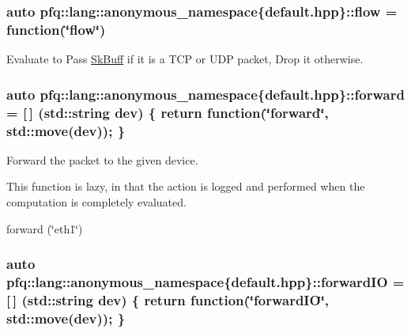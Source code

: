 \subsubsection[{\texorpdfstring{flow}{flow}}]{\setlength{\rightskip}{0pt plus 5cm}auto pfq\+::lang\+::anonymous\+\_\+namespace\{default.\+hpp\}\+::flow = {\bf function}(\char`\"{}flow\char`\"{})}\hypertarget{namespacepfq_1_1lang_1_1anonymous__namespace_02default_8hpp_03_af6c7518847c8c960b0e98cd856871a1b}{}\label{namespacepfq_1_1lang_1_1anonymous__namespace_02default_8hpp_03_af6c7518847c8c960b0e98cd856871a1b}


Evaluate to {\ttfamily Pass} \hyperlink{structpfq_1_1lang_1_1SkBuff}{Sk\+Buff} if it is a T\+CP or U\+DP packet, {\ttfamily Drop} it otherwise. 

\subsubsection[{\texorpdfstring{forward}{forward}}]{\setlength{\rightskip}{0pt plus 5cm}auto pfq\+::lang\+::anonymous\+\_\+namespace\{default.\+hpp\}\+::forward = \mbox{[}$\,$\mbox{]} (std\+::string dev) \{ return {\bf function}(\char`\"{}forward\char`\"{}, std\+::move(dev)); \}}\hypertarget{namespacepfq_1_1lang_1_1anonymous__namespace_02default_8hpp_03_aae08247030fea0f5e398b0a03d382257}{}\label{namespacepfq_1_1lang_1_1anonymous__namespace_02default_8hpp_03_aae08247030fea0f5e398b0a03d382257}


Forward the packet to the given device. 

This function is lazy, in that the action is logged and performed when the computation is completely evaluated.

forward (\char`\"{}eth1\char`\"{}) 
\subsubsection[{\texorpdfstring{forward\+IO}{forwardIO}}]{\setlength{\rightskip}{0pt plus 5cm}auto pfq\+::lang\+::anonymous\+\_\+namespace\{default.\+hpp\}\+::forward\+IO = \mbox{[}$\,$\mbox{]} (std\+::string dev) \{ return {\bf function}(\char`\"{}forward\+IO\char`\"{}, std\+::move(dev)); \}}\hypertarget{namespacepfq_1_1lang_1_1anonymous__namespace_02default_8hpp_03_a3fb6ec42e38c3329534ea3a7024fd967}{}\label{namespacepfq_1_1lang_1_1anonymous__namespace_02default_8hpp_03_a3fb6ec42e38c3329534ea3a7024fd967}


